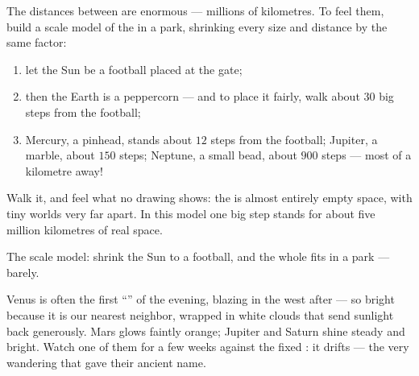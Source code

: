 \begin{method}\label{met:g4:solar-system:model}
The distances between  are enormous --- millions of
kilometres. To feel them, build a scale model of the 
in a park, shrinking every size and distance by the same factor:
\begin{enumerate}
  \item let the Sun be a football placed at the gate;
  \item then the Earth is a peppercorn --- and to place it fairly,
        walk about $30$ big steps from the football;
  \item Mercury, a pinhead, stands about $12$ steps from the
        football; Jupiter, a marble, about $150$ steps; Neptune, a
        small bead, about $900$ steps --- most of a kilometre away!
\end{enumerate}
Walk it, and feel what no drawing shows: the  is almost
entirely empty space, with tiny worlds very far apart. In this model
one big step stands for about five million kilometres of real space.
\end{method}

\begin{omfigure}

{\small The scale model: shrink the Sun to a football, and the
whole  fits in a park --- barely.}
\end{omfigure}

\begin{example}\label{ex:g4:solar-system:wanderers}
Venus is often the first ``'' of the evening, blazing in the
west after  --- so bright because it is our nearest
neighbor, wrapped in white clouds that send sunlight back
generously. Mars glows faintly orange; Jupiter and Saturn shine
steady and bright. Watch one of them for a few weeks against the
fixed : it drifts --- the very wandering that gave 
their ancient name.
\end{example}


